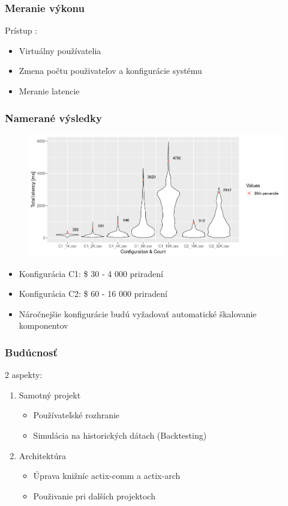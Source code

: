 \documentclass[10pt,xcolor=pdflatex]{beamer}
\begin{document}
\begin{frame}
    \frametitle{Meranie výkonu}
    Prístup :
    \begin{itemize}
        \item Virtuálny používatelia
        \item Zmena počtu použivateľov a konfigurácie systému
        \item Meranie latencie
    \end{itemize}

\end{frame}

\begin{frame}
    \frametitle{Namerané výsledky}
    \begin{figure}
        \includegraphics[width=\textwidth]{img/agg.png}
    \end{figure}
    \begin{itemize}
        \item<2-> Konfigurácia C1: \$ 30 - 4 000 priradení
        \item<3-> Konfigurácia C2: \$ 60 - 16 000 priradení
        \item<3-> Náročnejšie konfigurácie budú vyžadovať automatické škalovanie komponentov
    \end{itemize}

\end{frame}
\begin{frame}
    \frametitle{Budúcnosť}
    2 aspekty:
    \begin{enumerate}
        \item<2-> Samotný projekt
        \begin{itemize}
            \item <2-> Používateľské rozhranie
            \item <2-> Simulácia na historických dátach (Backtesting)
        \end{itemize}
        \item<3-> Architektúra
        \begin{itemize}
              \item <3-> Úprava knižníc actix-comm a actix-arch
              \item <3-> Použivanie pri dalších projektoch
        \end{itemize}
    \end{enumerate}
\end{frame}
\end{document}
